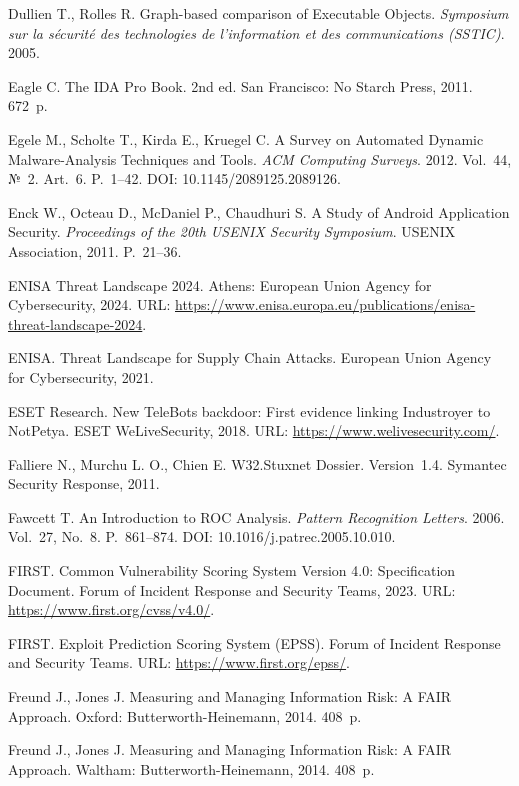  Dullien T., Rolles R. Graph-based comparison of Executable Objects. \emph{Symposium sur la sécurité des technologies de l'information et des communications (SSTIC)}. 2005.

 Eagle C. The IDA Pro Book. 2nd ed. San Francisco: No Starch Press, 2011. 672~p.

 Egele M., Scholte T., Kirda E., Kruegel C. A Survey on Automated Dynamic Malware-Analysis Techniques and Tools. \emph{ACM Computing Surveys}. 2012. Vol.~44, №~2. Art.~6. P.~1--42. DOI: 10.1145/2089125.2089126.

 Enck W., Octeau D., McDaniel P., Chaudhuri S. A Study of Android Application Security. \emph{Proceedings of the 20th USENIX Security Symposium}. USENIX Association, 2011. P.~21--36.

 ENISA Threat Landscape 2024. Athens: European Union Agency for Cybersecurity, 2024. URL: \url{https://www.enisa.europa.eu/publications/enisa-threat-landscape-2024}.

 ENISA. Threat Landscape for Supply Chain Attacks. European Union Agency for Cybersecurity, 2021.

 ESET Research. New TeleBots backdoor: First evidence linking Industroyer to NotPetya. ESET WeLiveSecurity, 2018. URL: \url{https://www.welivesecurity.com/}.

 Falliere N., Murchu L. O., Chien E. W32.Stuxnet Dossier. Version~1.4. Symantec Security Response, 2011.

 Fawcett T. An Introduction to ROC Analysis. \emph{Pattern Recognition Letters}. 2006. Vol.~27, No.~8. P.~861--874. DOI: 10.1016/j.patrec.2005.10.010.

 FIRST. Common Vulnerability Scoring System Version 4.0: Specification Document. Forum of Incident Response and Security Teams, 2023. URL: \url{https://www.first.org/cvss/v4.0/}.

 FIRST. Exploit Prediction Scoring System (EPSS). Forum of Incident Response and Security Teams. URL: \url{https://www.first.org/epss/}.

 Freund J., Jones J. Measuring and Managing Information Risk: A FAIR Approach. Oxford: Butterworth-Heinemann, 2014. 408~p.

 Freund J., Jones J. Measuring and Managing Information Risk: A FAIR Approach. Waltham: Butterworth-Heinemann, 2014. 408~p.


